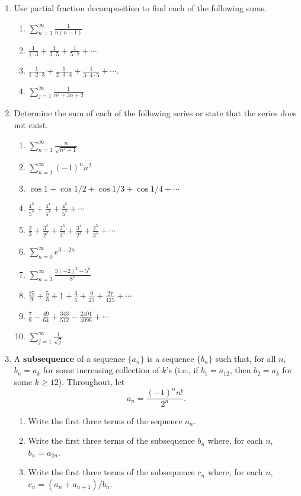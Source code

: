 \documentclass[12 pt]{article}
\begin{document}
\begin{enumerate}[leftmargin=0in, rightmargin=-0.25in]
	\item Use partial fraction decomposition to find each of the following sums.
	\begin{multicols}{2}
		\begin{enumerate}
			\item $\sum_{n=3}^\infty\frac{1}{n(n-1)}$
			\item $\frac{1}{1\cdot 3}+\frac{1}{3\cdot 5}+\frac{1}{5\cdot 7}+\cdots$.
			\item $\frac{1}{1\cdot 2\cdot 3}+\frac{1}{2\cdot 3\cdot 4}+\frac{1}{3\cdot 4\cdot 5}+\cdots$.
			\item $\sum_{j=1}^\infty\frac{1}{n^2+3n+2}$
		\end{enumerate}
	\end{multicols}

	\item Determine the sum of each of the following series or state that the series does not exist.
	\begin{multicols}{2}
		\begin{enumerate}
			\item $\sum_{n=1}^\infty \frac{n}{\sqrt{n^2+1}}$
			\item $\sum_{n=1}^\infty (-1)^n n^2$
			\item $\cos{1}+\cos{1/2}+\cos{1/3}+\cos{1/4}+\cdots$
			\item $\frac{4^3}{5^3}+\frac{4^4}{5^4}+\frac{4^5}{5^5}+\cdots$
			\item $\frac{2}{3}+\frac{3^2}{2^2}+\frac{2^3}{3^3}+\frac{3^4}{2^4}+\frac{2^5}{3^5}+\cdots$
			\item $\sum_{n=0}^\infty e^{3-2n}$
			\item $\sum_{n=3}^\infty \frac{3(-2)^2-5^n}{8^n}$
			\item $\frac{25}{9}+\frac{5}{3}+1+\frac{3}{5}+\frac{9}{25}+\frac{27}{125}+\cdots$
			\item $\frac{7}{8}-\frac{49}{64}+\frac{343}{512}-\frac{2401}{4096}+\cdots$
			\item $\sum_{j=1}^\infty \frac{1}{\sqrt{j}}$
		\end{enumerate}
	\end{multicols}
	
	\newpage
	
	\item A \textbf{subsequence} of a sequence $\{a_n\}$ is a sequence $\{b_n\}$ such that, for all $n$, $b_n=a_k$ for some increasing collection of $k$'s (i.e., if $b_1=a_{12}$, then $b_2=a_k$ for some $k\geq 12$). Throughout, let $$a_n=\frac{(-1)^nn!}{2^n}.$$
	\begin{enumerate}
		\item Write the first three terms of the sequence $a_n$.
		\item Write the first three terms of the subsequence $b_n$ where, for each $n$, $b_n=a_{2n}$.
		\item Write the first three terms of the subsequence $c_n$ where, for each $n$, $c_n=(a_n+a_{n+1})/b_n$.
	\end{enumerate}


\end{enumerate}
\end{document}
